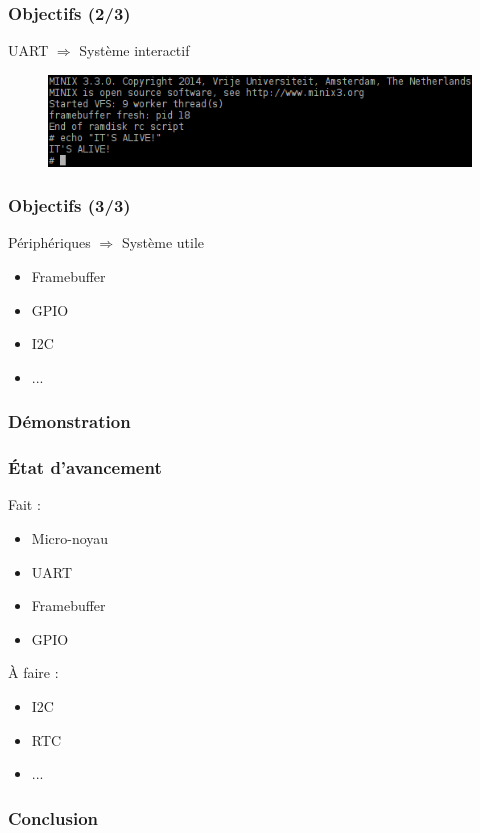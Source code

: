 \documentclass{beamer}
\begin{document}
\begin{frame}
\frametitle{Objectifs (2/3)}
UART $\Rightarrow$ Système interactif
\begin{figure}[center]
\includegraphics[width=12cm,natwidth=527,natheight=114]{console.png}
\end{figure}
\end{frame}

\begin{frame}
\frametitle{Objectifs (3/3)}
Périphériques $\Rightarrow$ Système utile
\begin{itemize}
\item Framebuffer
\item GPIO
\item I2C
\item ...
\end{itemize}
\end{frame}

\begin{frame}
\frametitle{Démonstration}
\end{frame}

\begin{frame}
\frametitle{État d'avancement}
Fait :
\begin{itemize}
\item Micro-noyau
\item UART
\item Framebuffer
\item GPIO
\end{itemize}

À faire :
\begin{itemize}
\item I2C
\item RTC
\item ...
\end{itemize}
\end{frame}

\begin{frame}
\frametitle{Conclusion}
\end{frame}
\end{document}
